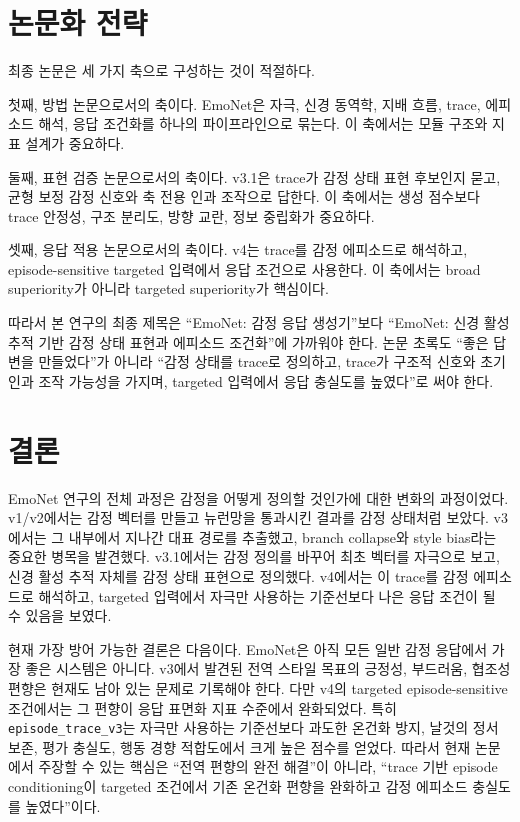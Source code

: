 \documentclass[11pt,a4paper]{article}
\newcommand{\eng}[1]{\texttt{#1}}
\begin{document}
\section{논문화 전략}

최종 논문은 세 가지 축으로 구성하는 것이 적절하다.

첫째, 방법 논문으로서의 축이다. EmoNet은 자극, 신경 동역학, 지배 흐름, trace, 에피소드 해석, 응답 조건화를 하나의 파이프라인으로 묶는다. 이 축에서는 모듈 구조와 지표 설계가 중요하다.

둘째, 표현 검증 논문으로서의 축이다. v3.1은 trace가 감정 상태 표현 후보인지 묻고, 균형 보정 감정 신호와 축 전용 인과 조작으로 답한다. 이 축에서는 생성 점수보다 trace 안정성, 구조 분리도, 방향 교란, 정보 중립화가 중요하다.

셋째, 응답 적용 논문으로서의 축이다. v4는 trace를 감정 에피소드로 해석하고, episode-sensitive targeted 입력에서 응답 조건으로 사용한다. 이 축에서는 broad superiority가 아니라 targeted superiority가 핵심이다.

따라서 본 연구의 최종 제목은 ``EmoNet: 감정 응답 생성기''보다 ``EmoNet: 신경 활성 추적 기반 감정 상태 표현과 에피소드 조건화''에 가까워야 한다. 논문 초록도 ``좋은 답변을 만들었다''가 아니라 ``감정 상태를 trace로 정의하고, trace가 구조적 신호와 초기 인과 조작 가능성을 가지며, targeted 입력에서 응답 충실도를 높였다''로 써야 한다.

\section{결론}

EmoNet 연구의 전체 과정은 감정을 어떻게 정의할 것인가에 대한 변화의 과정이었다. v1/v2에서는 감정 벡터를 만들고 뉴런망을 통과시킨 결과를 감정 상태처럼 보았다. v3에서는 그 내부에서 지나간 대표 경로를 추출했고, branch collapse와 style bias라는 중요한 병목을 발견했다. v3.1에서는 감정 정의를 바꾸어 최초 벡터를 자극으로 보고, 신경 활성 추적 자체를 감정 상태 표현으로 정의했다. v4에서는 이 trace를 감정 에피소드로 해석하고, targeted 입력에서 자극만 사용하는 기준선보다 나은 응답 조건이 될 수 있음을 보였다.

현재 가장 방어 가능한 결론은 다음이다. EmoNet은 아직 모든 일반 감정 응답에서 가장 좋은 시스템은 아니다. v3에서 발견된 전역 스타일 목표의 긍정성, 부드러움, 협조성 편향은 현재도 남아 있는 문제로 기록해야 한다. 다만 v4의 targeted episode-sensitive 조건에서는 그 편향이 응답 표면화 지표 수준에서 완화되었다. 특히 \eng{episode\_trace\_v3}는 자극만 사용하는 기준선보다 과도한 온건화 방지, 날것의 정서 보존, 평가 충실도, 행동 경향 적합도에서 크게 높은 점수를 얻었다. 따라서 현재 논문에서 주장할 수 있는 핵심은 ``전역 편향의 완전 해결''이 아니라, ``trace 기반 episode conditioning이 targeted 조건에서 기존 온건화 편향을 완화하고 감정 에피소드 충실도를 높였다''이다.
\end{document}

